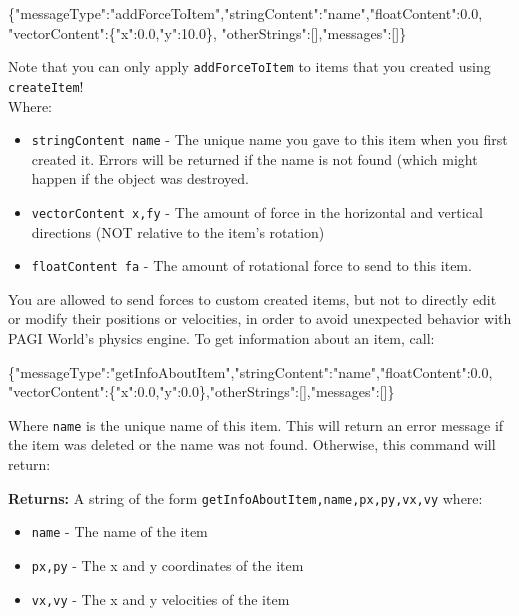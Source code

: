 \begin{center}
\scriptsize{\{"messageType":"addForceToItem","stringContent":"name","floatContent":0.0, "vectorContent":\{"x":0.0,"y":10.0\}, "otherStrings":[],"messages":[]\}} 
\end{center}
\noindent Note that you can only apply \texttt{addForceToItem} to items that you created using \texttt{createItem}!
\\Where:
\begin{itemize}
\item \texttt{stringContent name} - The unique name you gave to this item when you first created it. Errors will be returned if the name is not found (which might happen if the object was destroyed.
\item \texttt{vectorContent x,fy} - The amount of force in the horizontal and vertical directions (NOT relative to the item's rotation)
\item \texttt{floatContent fa} - The amount of rotational force to send to this item.
\end{itemize}

You are allowed to send forces to custom created items, but not to directly edit or modify their positions or velocities, in order to avoid unexpected behavior with PAGI World's physics engine. %
To get information about an item, call:
\begin{center}
	\scriptsize{\{"messageType":"getInfoAboutItem","stringContent":"name","floatContent":0.0, "vectorContent":\{"x":0.0,"y":0.0\},"otherStrings":[],"messages":[]\}}
\end{center}
Where \texttt{name} is the unique name of this item. This will return an error message if the item was deleted or the name was not found. Otherwise, this command will return:

\noindent \textbf{Returns:} A string of the form \texttt{getInfoAboutItem,name,px,py,vx,vy} where:

\begin{itemize}
\item \texttt{name} - The name of the item
\item \texttt{px,py} - The x and y coordinates of the item
\item \texttt{vx,vy} - The x and y velocities of the item
\end{itemize}

